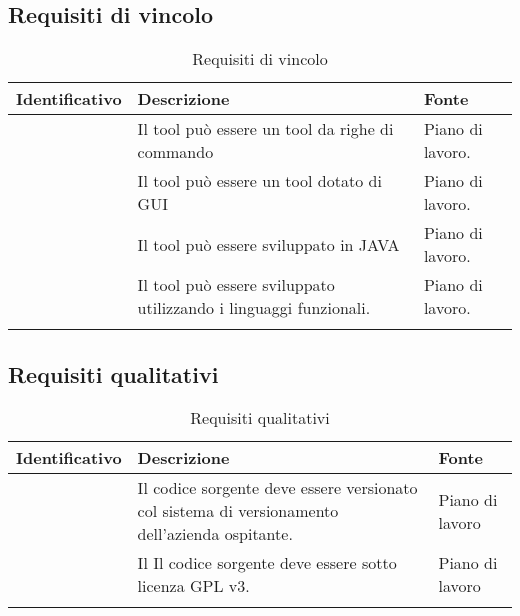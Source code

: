 \subsection{Requisiti di vincolo}\label{subsec:requisiti-vincolo}
\begin{center}
    \begin{longtable}{ | c| C{7cm} |C{3cm} |}
        \hline
        \textbf{Identificativo} & \textbf{Descrizione}                                              & \textbf{Fonte}   \\\hline
               & Il tool può essere un tool da righe di commando                   & Piano di lavoro. \\\hline
               & Il tool può essere un tool dotato di GUI                          & Piano di lavoro. \\\hline
               & Il tool può essere sviluppato in JAVA                             & Piano di lavoro. \\\hline
               & Il tool può essere sviluppato utilizzando i linguaggi funzionali. & Piano di lavoro. \\\hline
        \caption{Requisiti di vincolo}
    \end{longtable}
\end{center}
\setcounter{rowcount}{0}

\subsection{Requisiti qualitativi}\label{subsec:requisiti-qualitativi}
\begin{center}
    \begin{longtable}{ | c| C{7cm} |C{3cm} |}
        \hline
        \textbf{Identificativo} & \textbf{Descrizione}                                                                           & \textbf{Fonte}  \\\hline
               & Il codice sorgente deve essere versionato col sistema di versionamento dell'azienda ospitante. & Piano di lavoro \\\hline
               & Il Il codice sorgente deve essere sotto licenza GPL v3.                                        & Piano di lavoro \\\hline
        \caption{Requisiti qualitativi}
    \end{longtable}
\end{center}
\setcounter{subCount}{0}
\setcounter{rowcount}{0}